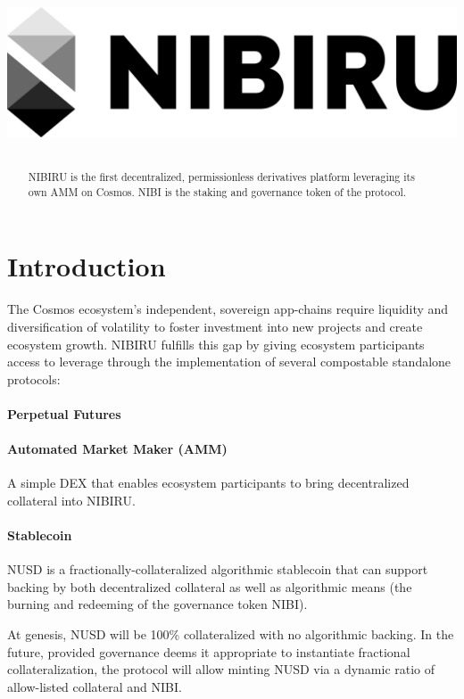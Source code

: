 \documentclass[11pt]{article}
\title{
\begin{center}
 \includegraphics[scale=0.18]{nibi-logo-onwhite.png} 
\end{center} 
}
\begin{document}
\maketitle

\onecolumn
\begin{abstract}
NIBIRU is the first decentralized, permissionless derivatives platform leveraging its own AMM on Cosmos. NIBI is the staking and  governance token of the protocol.
\end{abstract}

\part*{Introduction}
\label{Section1}


The Cosmos ecosystem's independent, sovereign app-chains require liquidity and diversification of volatility to foster investment into new projects and create ecosystem growth. NIBIRU fulfills this gap by giving ecosystem participants access to leverage through the implementation of several compostable standalone protocols:

\subsection*{Perpetual Futures}

\subsection*{Automated Market Maker (AMM)} 
A simple DEX that enables ecosystem participants to bring decentralized collateral into NIBIRU.


\subsection*{Stablecoin} 
NUSD is a fractionally-collateralized algorithmic stablecoin that can support backing by both decentralized collateral as well as algorithmic means (the burning and redeeming of the governance token NIBI).

At genesis, NUSD will be 100\% collateralized with no algorithmic backing. In the future, provided governance deems it appropriate to instantiate fractional collateralization, the protocol will allow minting NUSD via a dynamic ratio of allow-listed collateral and NIBI.
\end{document}
